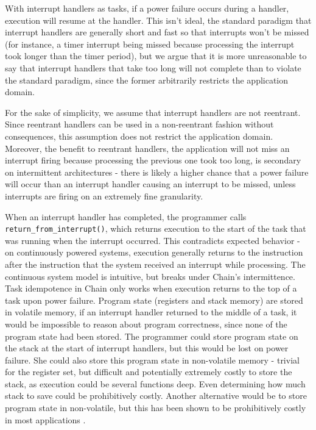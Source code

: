 \documentclass[11pt]{sensys-proc}
\newcommand{\chain}{Chain\xspace}
\begin{document}
With interrupt handlers as tasks, if a power failure occurs during a
handler, execution will resume at the handler. This isn't ideal, the
standard paradigm that interrupt handlers are generally short and fast
so that interrupts won't be missed (for instance, a timer interrupt
being missed because processing the interrupt took longer than the
timer period), but we argue that it is more unreasonable to say
that interrupt handlers that take too long will not complete than
to violate the standard paradigm, since the former arbitrarily restricts
the application domain.


For the sake of simplicity, we assume that interrupt handlers are not
reentrant. Since reentrant handlers can be used in a non-reentrant fashion
without consequences, this assumption does not restrict the application domain.
Moreover, the benefit to reentrant handlers, the application will not miss an
interrupt firing because processing the previous one took too long, is
secondary on intermittent architectures - there is likely a higher chance that
a power failure will occur than an interrupt handler causing an interrupt to be
missed, unless interrupts are firing on an extremely fine granularity.


When an interrupt handler has completed, the programmer calls
\texttt{return\_from\_interrupt()}, which returns execution to the start
of the task that was running when the interrupt occurred. This contradicts
expected behavior - on continuously powered systems, execution generally
returns to the instruction after the instruction that the system received an
interrupt while processing. The continuous system model is intuitive, but
breaks under \chain's intermittence. Task idempotence in \chain only works
when execution returns to the top of a
task upon power failure. Program state (registers and stack memory) are stored
in volatile memory, if an interrupt handler returned to the middle of a task,
it would be impossible to reason about program correctness, since none of the
program state had been stored. The programmer could store program state on the
stack at the start of interrupt handlers, but this would be lost on power
failure. She could also store this program state in non-volatile memory -
trivial for the register set, but difficult and potentially extremely costly to
store the stack, as execution could be several functions deep. Even determining
how much stack to save could be prohibitively costly. Another alternative would
be to store program state in non-volatile, but this has been shown to be
prohibitively costly in most applications \cite{Aware}.
\end{document}
